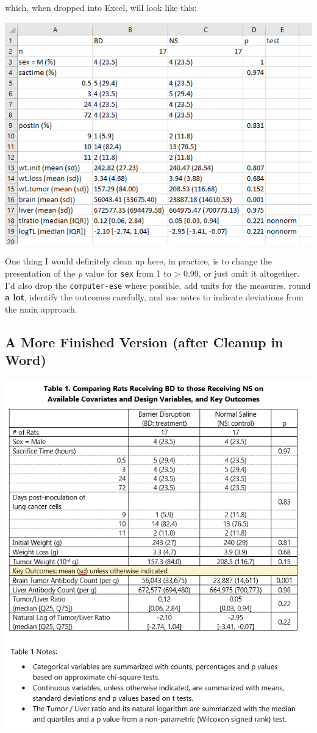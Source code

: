 \documentclass[]{book}
\theoremstyle{definition}
\theoremstyle{definition}
\theoremstyle{definition}
\theoremstyle{remark}
\begin{document}
which, when dropped into Excel, will look like this:

\includegraphics[width=0.9\linewidth]{images/bb-table1inExcel}

One thing I would definitely clean up here, in practice, is to change
the presentation of the \emph{p} value for \texttt{sex} from 1 to
\textgreater{} 0.99, or just omit it altogether. I'd also drop the
\texttt{computer-ese} where possible, add units for the measures, round
\textbf{a lot}, identify the outcomes carefully, and use notes to
indicate deviations from the main approach.

\subsection{A More Finished Version (after Cleanup in
Word)}\label{a-more-finished-version-after-cleanup-in-word}

\includegraphics[width=0.95\linewidth]{images/bb-table1inWord}
\end{document}
